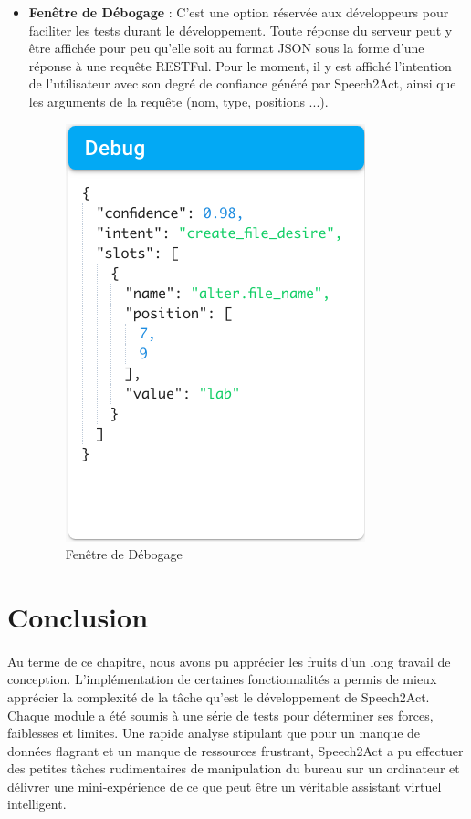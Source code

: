 \begin{itemize}
	\item \textbf{Fenêtre de Débogage} : C'est une option réservée aux développeurs pour faciliter les tests durant le développement. Toute réponse du serveur peut y être affichée pour peu qu'elle soit au format JSON sous la forme d'une réponse à une requête RESTFul. Pour le moment, il y est affiché l'intention de l'utilisateur avec son degré de confiance généré par Speech2Act, ainsi que les arguments de la requête (nom, type, positions ...).
	
	\begin{figure}[H]
		\centering
		\includegraphics[width=.38\linewidth]{images/implementation/app_screens/debug.png}
		\caption{Fenêtre de Débogage}
	\end{figure} 

\end{itemize}
\section{Conclusion}
\paragraph{}
Au terme de ce chapitre, nous avons pu apprécier les fruits d'un long travail de conception. L'implémentation de certaines fonctionnalités a permis de mieux apprécier la complexité de la tâche qu'est le développement de Speech2Act. Chaque module a été soumis à une série de tests pour déterminer ses forces, faiblesses et limites. Une rapide analyse stipulant que pour un manque de données flagrant et un manque de ressources frustrant, Speech2Act a pu effectuer des petites tâches rudimentaires de manipulation du bureau sur un ordinateur et délivrer une mini-expérience de ce que peut être un véritable assistant virtuel intelligent.

